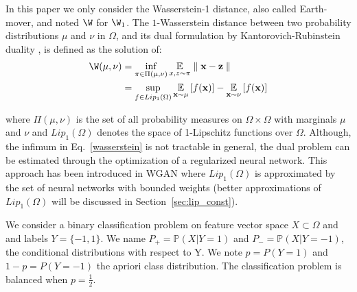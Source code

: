 In this paper we only consider the Wasserstein-1 distance, also called Earth-mover, and noted $\W$ for $\W_1$.
The $1$-Wasserstein distance between two probability distributions $\mu$ and $\nu$ in $\Omega$, and its dual formulation by Kantorovich-Rubinstein duality \cite{villani2008}, is defined as the solution of:
\begin{subequations}

\begin{align}
\W(\mu,\nu) & = \inf_{\pi \in \Pi(\mu,\nu)}\underset{x,z \sim \pi}{\mathbb{E}}\parallel \textbf{x}-\textbf{z} \parallel \label{wasserstein}\\
  & =\sup_{f \in Lip_1(\Omega)} \underset{\textbf{x} \sim \mu}{\mathbb{E}} \left[f(\textbf{x} )\right] -\underset{\textbf{x}  \sim \nu}{\mathbb{E}} \left[f(\textbf{x} )\right] \label{kantorovich}
\end{align}
\end{subequations}

where $\Pi(\mu,\nu)$ is the set of all probability measures on $\Omega\times \Omega$ with marginals $\mu$ and $\nu$ and $Lip_1(\Omega)$ denotes the space of 1-Lipschitz functions over $\Omega$. 
Although, the infimum in Eq.~\eqref{wasserstein} is not tractable in general, the dual problem can be estimated through the optimization of a regularized neural network. This approach has been introduced in WGAN  \cite{Arjovsky2017} where $Lip_1(\Omega)$ is approximated by the set of neural networks with bounded weights (better approximations of $Lip_1(\Omega)$ will be discussed in Section~\ref{sec:lip_const}). 

We consider a binary classification problem on feature vector space $X\subset \Omega$ and and labels $Y= \{-1,1\}$. We name $P_+=\mathbb{P}(X|Y=1)$ and  $P_-=\mathbb{P}(X|Y=-1)$, the conditional distributions with respect to Y. We note $p=P(Y=1)$ and $1-p=P(Y=-1)$ the apriori class distribution. The classification problem is balanced when $p=\frac{1}{2}$.\\

